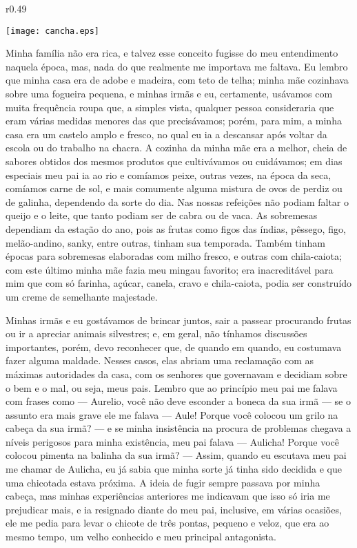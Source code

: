 \begin{wrapfigure}{r}{0.49\textwidth}
  \begin{center}
  \vspace{-20pt}
    \texttt{[image: cancha.eps]}
  \end{center}
  \vspace{-20pt}
\end{wrapfigure}
Minha família não era rica, e talvez esse conceito fugisse do meu entendimento naquela época, mas, nada do que realmente me importava me faltava.
Eu lembro que minha casa era de adobe e madeira, com teto de telha; minha mãe cozinhava sobre uma fogueira pequena, e minhas irmãs e eu, certamente, usávamos com muita frequência roupa que, a simples vista, qualquer pessoa consideraria que eram várias medidas menores das que precisávamos;
porém, para mim, a minha casa era um castelo amplo e fresco, no qual eu ia a descansar após voltar da escola ou do trabalho na chacra. 
A cozinha da minha mãe era a melhor, cheia de sabores obtidos dos mesmos produtos que cultivávamos ou cuidávamos; em dias especiais meu pai ia ao rio e comíamos peixe, outras vezes, na época da seca, comíamos carne de sol, e mais comumente alguma mistura de ovos de perdiz ou de galinha, dependendo da sorte do dia.
Nas nossas refeições não podiam faltar o queijo e o leite, que tanto podiam ser de cabra ou de vaca.
As sobremesas dependiam da estação do ano, pois as frutas como figos das índias, pêssego, figo, melão-andino, sanky, entre outras, tinham sua temporada. Também tinham épocas para sobremesas elaboradas com milho fresco, e outras com chila-caiota; com este último minha mãe fazia meu mingau favorito; era inacreditável para mim que com só farinha, açúcar, canela, cravo e chila-caiota, podia ser construído um creme de semelhante majestade.

Minhas irmãs e eu gostávamos de brincar juntos, sair a passear procurando frutas ou ir a apreciar animais silvestres; e, em geral, não tínhamos discussões importantes, porém, devo reconhecer que, de quando em quando, eu costumava fazer alguma maldade.
Nesses casos, elas abriam uma reclamação com as máximas autoridades da casa, com os senhores que governavam e decidiam sobre o bem e o mal, ou seja, meus pais. 
Lembro que ao princípio meu pai me falava com frases como --- Aurelio, você não deve esconder a boneca da sua irmã --- se o assunto era mais grave ele me falava --- Aule! Porque você colocou um grilo na cabeça da sua irmã? --- e se minha insistência na procura de problemas chegava a níveis perigosos para minha existência, meu pai falava --- Aulicha! Porque você colocou pimenta na balinha da sua irmã? ---
Assim, quando eu escutava meu pai me chamar de Aulicha, eu já sabia que minha sorte já tinha sido decidida e que uma chicotada estava próxima. A ideia de fugir sempre passava por minha cabeça, mas minhas experiências anteriores me indicavam que isso só iria me prejudicar mais, e ia resignado diante do meu pai, inclusive, em várias ocasiões, ele me pedia para levar o chicote de três pontas, pequeno e veloz, que era ao mesmo tempo, um velho conhecido e meu principal antagonista.

